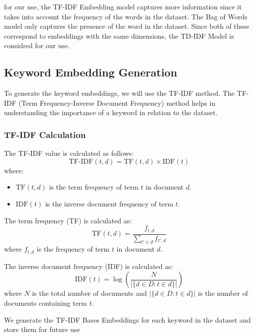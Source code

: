 \documentclass{article}
\begin{document}
for our use, the TF-IDF Embedding model captures more information since it takes into account the frequency of the words in the dataset. The Bag of Words model only captures the presence of the word in the dataset.
Since both of these correspond to embeddings with the same dimensions, the TD-IDF Model is considred for our use.

\subsection{Keyword Embedding Generation}
To generate the keyword embeddings, we will use the TF-IDF method. The TF-IDF (Term Frequency-Inverse Document Frequency) method helps in understanding the importance of a keyword in relation to the dataset.

\subsubsection{TF-IDF Calculation}
The TF-IDF value is calculated as follows:
\begin{equation}
\text{TF-IDF}(t, d) = \text{TF}(t, d) \times \text{IDF}(t)
\end{equation}
where:
\begin{itemize}
    \item $\text{TF}(t, d)$ is the term frequency of term $t$ in document $d$.
    \item $\text{IDF}(t)$ is the inverse document frequency of term $t$.
\end{itemize}
The term frequency (TF) is calculated as:
\begin{equation}
\text{TF}(t, d) = \frac{f_{t,d}}{\sum_{t' \in d} f_{t',d}}
\end{equation}
where $f_{t,d}$ is the frequency of term $t$ in document $d$.

The inverse document frequency (IDF) is calculated as:
\begin{equation}
\text{IDF}(t) = \log \left( \frac{N}{|\{d \in D : t \in d\}|} \right)
\end{equation}
where $N$ is the total number of documents and $|\{d \in D : t \in d\}|$ is the number of documents containing term $t$.

We generate the TF-IDF Bases Embeddings for each keyword in the dataset and store them for future use
\end{document}
